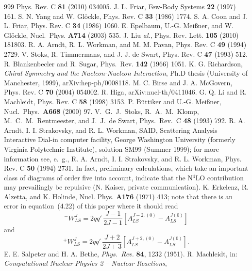\documentclass[sort&compress,preprint,3p]{elsarticle}
\begin{document}
\begin{thebibliography}{999}
Phys. Rev. C {\bf 81} (2010) 034005.
 J. L. Friar,
Few-Body Systems {\bf 22} (1997) 161.
 S. N. Yang and W. Gl\"ockle,
Phys. Rev. C {\bf 33} (1986) 1774.
 S. A. Coon and J. L. Friar,
Phys. Rev. C {\bf 34} (1986) 1060.
E. Epelbaum, U.-G. Mei\ss ner, and W. Gl\"ockle, 
Nucl.\ Phys. {\bf A714} (2003) 535.
J. Liu {\it al.}, Phys. Rev. Lett. {\bf 105} (2010) 181803.
 R. A. Arndt, R. L. Workman, and M. M. Pavan,
Phys. Rev. C {\bf 49} (1994) 2729.
 V. Stoks, R. Timmermans, and J. J. de Swart,
Phys. Rev. C {\bf 47} (1993) 512.
 R. Blankenbecler and R. Sugar, 
Phys.\ Rev.\/ {\bf 142} (1966) 1051.
K. G. Richardson, {\it Chiral Symmetry and the Nucleon-Nucleon
Interaction}, Ph.D thesis (University of Manchester, 1999), 
arXiv:hep-ph/0008118.
M. C. Birse and J. A. McGovern,
Phys. Rev. C {\bf 70} (2004) 054002.
R. Higa, arXiv:nucl-th/0411046.
 G. Q. Li and R. Machleidt, Phys. Rev. C {\bf 58} (1998)
3153.
 P. B\"{u}ttiker and U.-G. Mei\ss ner,
Nucl.\ Phys.\ {\bf A668} (2000) 97.
 V.\ G.\ J.\ Stoks, R.\ A.\ M.\ Klomp, 
M.\ C.\ M.\ Rentmeester, and J.\ J.\ de Swart, 
Phys.\ Rev.\ C {\bf 48} (1993) 792.
R. A. Arndt, I. I. Strakovsky, and R. L. Workman,
SAID, Scattering Analysis Interactive Dial-in computer facility,
George Washington University
(formerly Virginia Polytechnic Institute), 
solution SM99 (Summer 1999); for more information see, e.~g.,
R. A. Arndt, I. I. Strakovsky, and R. L. Workman,
Phys. Rev. C {\bf 50} (1994) 2731.
In fact, preliminary calculations, which take an important
class of diagrams of order five into account, indicate that
the N$^4$LO contribution may prevailingly be repulsive
(N. Kaiser, private communication).
K. Erkelenz, R. Alzetta, and K. Holinde, Nucl. Phys. {\bf 
A176} (1971) 413;
note that there is an error in equation~(4.22) of this paper 
where it should read
\begin{displaymath}
^-W^J_{LS}=2qq' \, \frac{J-1}{2J-1} \left[A^{J-2,(0)}_{LS} 
- A^{J(0)}_{LS} \right]
\end{displaymath}
and 
\begin{displaymath}
^+W^J_{LS}=2qq' \, \frac{J+2}{2J+3} \left[A^{J+2,(0)}_{LS} 
- A^{J(0)}_{LS} \right].
\end{displaymath}
 E. E. Salpeter and H. A. Bethe, 
{\it Phys.\ Rev.\/} {\bf 84}, 1232 (1951).
R. Machleidt, in: {\it Computational Nuclear Physics 2 -- Nuclear Reactions},

\end{thebibliography}
\end{document}
